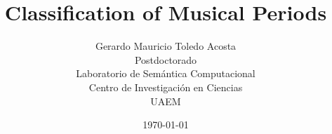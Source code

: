 \documentclass{beamer}
\theoremstyle{plain}
\numberwithin{equation}{section} %
\numberwithin{figure}{section} %
\numberwithin{table}{section} %
\begin{document}

\title[]{Classification of Musical Periods}
\author[Mauricio Toledo-Acosta]{Gerardo Mauricio Toledo Acosta\\
\medskip
{\small Postdoctorado\\ 
Laboratorio de Semántica Computacional\\
Centro de Investigación en Ciencias\\
UAEM
} 
}

\date{\today}

{
\maketitle }

\end{document}
